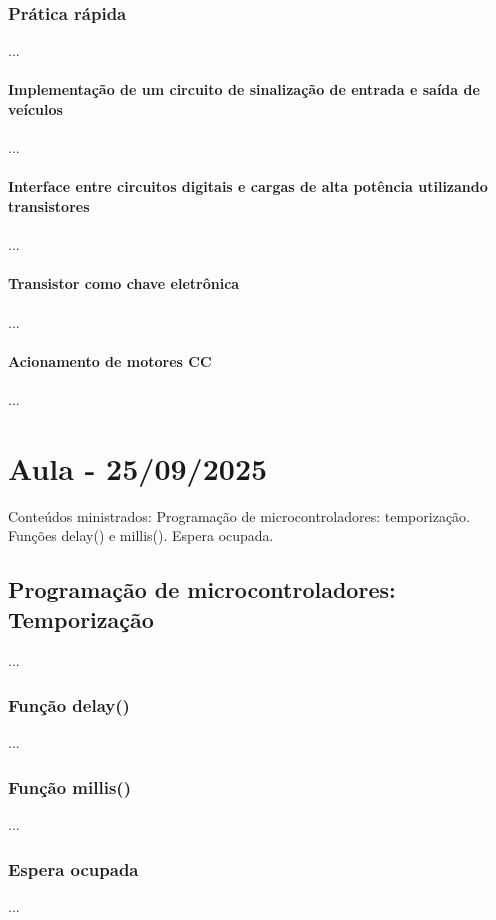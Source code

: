 \documentclass{article}
\begin{document}
\subsubsection{Prática rápida}
...

\paragraph{Implementação de um circuito de sinalização de entrada e saída de veículos}
...

\paragraph{Interface entre circuitos digitais e cargas de alta potência utilizando transistores}
...

\paragraph{Transistor como chave eletrônica}
...

\paragraph{Acionamento de motores CC}
...

\section{Aula - 25/09/2025}
Conteúdos ministrados:  Programação de microcontroladores: temporização. Funções delay() e millis(). Espera ocupada.

\subsection{Programação de microcontroladores: Temporização}
...

\subsubsection{Função delay()}
...

\subsubsection{Função millis()}
...

\subsubsection{Espera ocupada}
...
\end{document}
